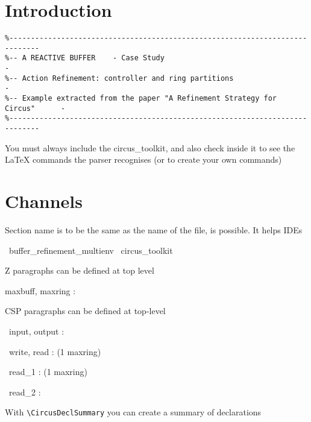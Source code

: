 \documentclass{article}
\begin{document}
\section{Introduction}

\begin{verbatim}
%-----------------------------------------------------------------------------
%-- A REACTIVE BUFFER    - Case Study                                        -
%-- Action Refinement: controller and ring partitions                        -
%-- Example extracted from the paper "A Refinement Strategy for Circus"      -
%-----------------------------------------------------------------------------
\end{verbatim}


You must always include the circus\_toolkit, and also check inside
it to see the LaTeX commands the parser recognises (or to create
your own commands)

\section{Channels}

Section name is to be the same as the name of the file, is possible. It helps IDEs
%
\begin{zsection}
  \SECTION\ buffer\_refinement\_multienv \parents\ circus\_toolkit
\end{zsection}

Z paragraphs can be defined at top level
\begin{axdef}
 maxbuff, maxring : \nat
\end{axdef}

CSP paragraphs can be defined at top-level 
\begin{circus}
 \circchannel\ input, output : \nat
\end{circus}

\begin{circus}
 \circchannel\ write, read : (1 \upto maxring) \cross \nat
\end{circus}

\begin{circus}
 \circchannel\ read\_1 : (1 \upto maxring)
\end{circus}

\begin{circus}
 \circchannel\ read\_2 : \nat
\end{circus}

With \verb'\CircusDeclSummary' you can create a summary of declarations
%
\CircusDeclSummary
\end{document}
